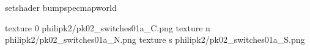 setshader bumpspecmapworld

texture 0 philipk2/pk02_switches01a_C.png
texture n philipk2/pk02_switches01a_N.png
texture s philipk2/pk02_switches01a_S.png

